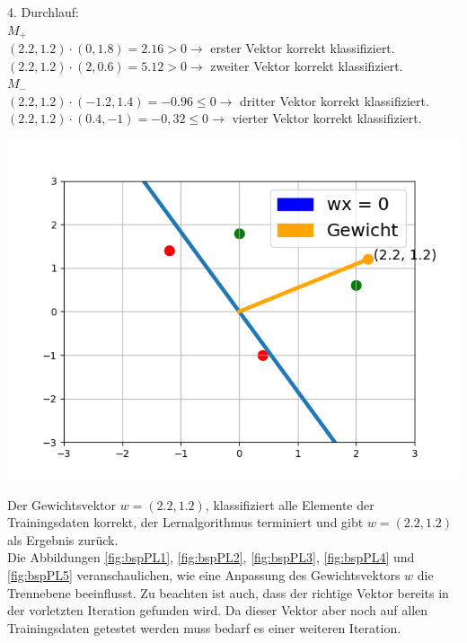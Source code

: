 \documentclass[fontsize=11pt]{scrartcl}
\newenvironment{Figure}
  {\par\medskip\noindent\minipage{\linewidth}}
  {\endminipage\par\medskip}
\begin{document}
                        4. Durchlauf:\\
                        $M_+$\\
                        $(2.2,1.2)\cdot (0,1.8) = 2.16 > 0 \rightarrow$ erster Vektor korrekt klassifiziert.\\
                        $(2.2,1.2)\cdot (2,0.6) = 5.12 > 0 \rightarrow$ zweiter Vektor korrekt klassifiziert.\\
                        $M_-$\\
                        $(2.2,1.2)\cdot (-1.2,1.4) = -0.96 \leq 0 \rightarrow$ dritter Vektor korrekt klassifiziert.\\
                        $(2.2,1.2)\cdot (0.4,-1) = -0,32 \leq 0 \rightarrow$ vierter Vektor korrekt klassifiziert.
                        \begin{Figure}
                            \centering
                            \includegraphics[scale=0.5]{bsp4.png}
                            \label{fig:bspPL5}    
                        \end{Figure}
                        Der Gewichtsvektor $w = (2.2,1.2)$, klassifiziert alle Elemente der Trainingsdaten korrekt, der Lernalgorithmus terminiert und gibt $w = (2.2,1.2)$ als Ergebnis zurück.\\
                        Die Abbildungen \ref{fig:bspPL1}, \ref{fig:bspPL2}, \ref{fig:bspPL3}, \ref{fig:bspPL4} und \ref{fig:bspPL5} veranschaulichen, wie eine Anpassung des Gewichtsvektors $w$ die Trennebene beeinflusst.
                        Zu beachten ist auch, dass der richtige Vektor bereits in der vorletzten Iteration gefunden wird. Da dieser Vektor aber noch auf allen Trainingsdaten getestet werden muss bedarf es einer weiteren Iteration.
\end{document}
